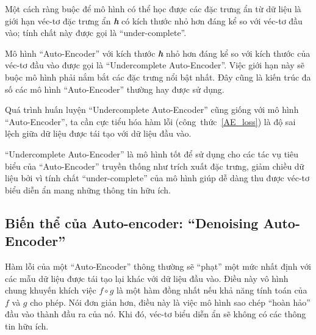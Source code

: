     Một cách ràng buộc để mô hình có thể học được các đặc trưng ẩn từ dữ liệu
    là giới hạn véc-tơ đặc trưng ẩn \textbf{\textit{h}} có kích thước nhỏ hơn đáng kể so với véc-tơ đầu vào;
    tính chất này được gọi là ``under-complete''.
    
    Mô hình ``Auto-Encoder'' với kích thước \textbf{\textit{h}} nhỏ hơn đáng kể so với kích thước của véc-tơ đầu vào
    được gọi là ``Undercomplete Auto-Encoder''. Việc giới hạn này sẽ buộc mô hình phải nắm bắt các đặc trưng
    nổi bật nhất. Đây cũng là kiến trúc đa số các mô hình ``Auto-Encoder'' thường hay được sử dụng.

    Quá trình huấn luyện ``Undercomplete Auto-Encoder'' cũng giống với mô hình ``Auto-Encoder'',
    ta cần cực tiểu hóa hàm lỗi (công~thức~\ref{AE_loss}) là độ sai lệch giữa dữ liệu được tái tạo
    với dữ liệu đầu vào.

    ``Undercomplete Auto-Encoder'' là mô hình tốt để sử dụng cho các tác vụ tiêu biểu của ``Auto-Encoder'' truyền thống
    như trích xuất đặc trưng, giảm chiều dữ liệu 
    bởi vì tính chất ``under-complete'' của mô hình giúp dễ dàng thu được véc-tơ biểu diễn ẩn mang những thông tin hữu ích.


    \subsection{Biến thể của Auto-encoder: ``Denoising Auto-Encoder''}
    \label{chap2/subsec12}
    
    Hàm lỗi của một ``Auto-Encoder'' thông thường sẽ ``phạt'' một mức nhất định với các mẫu dữ liệu được tái tạo lại
    khác với dữ liệu đầu vào. Điều này vô hình chung khuyến khích việc 
    \begin{math}
        f \circ g
    \end{math}
    là một hàm đồng nhất nếu khả năng tính toán của 
    \begin{math}
        f
    \end{math} 
    và
    \begin{math}
        g
    \end{math}
    cho phép. Nói đơn giản hơn, điều này là việc mô hình sao chép ``hoàn hảo'' đầu vào thành đầu ra của nó.
    Khi đó, véc-tơ biểu diễn ẩn sẽ không có các thông tin hữu ích. 

